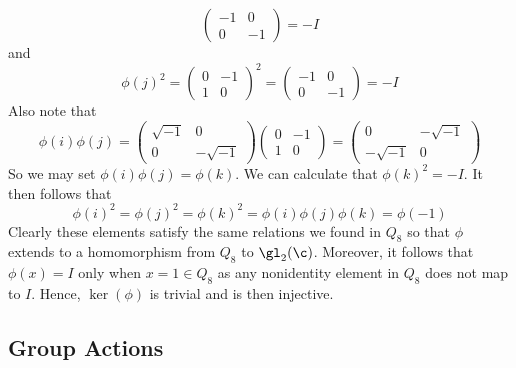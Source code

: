 \begin{problems}
\begin{sol}
\[        \begin{pmatrix}
            -1 & 0 \\
            0 & -1
        \end{pmatrix} = -I
        \]
        and
        \[\phi(j)^2 =
        \begin{pmatrix}
            0 & -1 \\
            1 & 0
        \end{pmatrix}^2 = 
        \begin{pmatrix}
            -1 & 0 \\
            0 & -1
        \end{pmatrix} = -I
        \]
        Also note that
        \[\phi(i)\phi(j) = 
        \begin{pmatrix}
            \sqrt{-1} & 0 \\
            0 & -\sqrt{-1}
        \end{pmatrix}
        \begin{pmatrix}
            0 & -1 \\
            1 & 0
        \end{pmatrix} = 
        \begin{pmatrix}
            0 & -\sqrt{-1} \\
            -\sqrt{-1} & 0
        \end{pmatrix}\]
        So we may set $\phi(i)\phi(j) = \phi(k)$. We can calculate that $\phi(k)^2 = -I$. It then follows that
        \[\phi(i)^2 = \phi(j)^2 = \phi(k)^2 = \phi(i)\phi(j)\phi(k) = \phi(-1)\]
        Clearly these elements satisfy the same relations we found in $Q_8$ so that $\phi$ extends to a homomorphism from $Q_8$ to $\gl_2(\c)$. Moreover, it follows that $\phi(x) = I$ only when $x = 1 \in Q_8$ as any nonidentity element in $Q_8$ does not map to $I$. Hence, $\ker(\phi)$ is trivial and is then injective.
    \end{sol}
\end{problems}

\newpage

\subsection{Group Actions}

